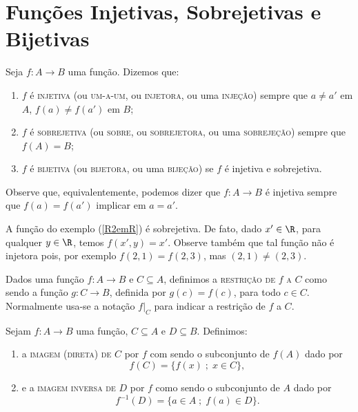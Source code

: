 \section{Fun\c{c}\~oes Injetivas, Sobrejetivas e Bijetivas}

\begin{definition}
Seja $f:A \rightarrow B$ uma fun\c{c}\~ao. Dizemos que:
\begin{enumerate}
    \item $f$ \'e \textsc{injetiva} (ou \textsc{um-a-um}, ou \textsc{injetora}, ou uma
    \textsc{inje\c{c}\~ao}) sempre que $a \neq a'$ em $A$, $f(a)\neq
    f(a')$ em $B$;
    \item $f$ \'e \textsc{sobrejetiva} (ou \textsc{sobre}, ou \textsc{sobrejetora}, ou uma
    \textsc{sobreje\c{c}\~ao}) sempre que $f(A)=B$;
    \item $f$ \'e  \textsc{bijetiva} (ou \textsc{bijetora}, ou uma \textsc{bije\c{c}\~ao}) se $f$
    \'e injetiva e sobrejetiva.
\end{enumerate}
\end{definition}

Observe que, equivalentemente, podemos dizer que $f:A \rightarrow
B$ \'e injetiva sempre que $f(a)=f(a')$ implicar em $a=a'$.

\begin{example}
A fun\c{c}\~ao do exemplo (\ref{R2emR}) \'e sobrejetiva. De fato, dado $x'
\in \R$, para qualquer $y \in \R$, temos $f(x',y)=x'$. Observe
tamb\'em que tal fun\c{c}\~ao n\~ao \'e injetora pois, por exemplo
$f(2,1)=f(2,3)$, mas $(2,1)\neq (2,3)$.
\end{example}
\begin{definition}
Dados uma fun\c{c}\~ao $f:A \rightarrow B$ e $C\subseteq A$, definimos a
\textsc{restri\c{c}\~ao de} $f$ \textsc{a} $C$ como sendo a fun\c{c}\~ao $g:C
\rightarrow B$, definida por $g(c)=f(c)$, para todo $c \in C$.
Normalmente usa-se a nota\c{c}\~ao $f|_C$ para indicar a restri\c{c}\~ao de
$f$ a $C$.
\end{definition}
\begin{definition}
Sejam $f:A \rightarrow B$ uma fun\c{c}\~ao, $C \subseteq A$ e $D
\subseteq B$. Definimos:
\begin{enumerate}
    \item a \textsc{imagem (direta) de} $C$ por $f$ com sendo o subconjunto
    de $f(A)$ dado por
    $$
     f(C)=\{f(x)\;;\; x \in C \},
    $$
    \item  e a \textsc{imagem inversa de} $D$ por $f$ como sendo o subconjunto
    de $A$ dado por
    $$
    f^{-1}(D)=\{a \in A\;;\; f(a) \in D \}.
    $$
\end{enumerate}
\end{definition}

